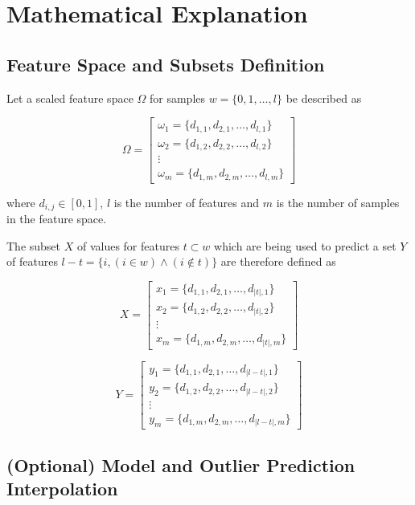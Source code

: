 \documentclass[a4paper, oneside, twocolumn]{article}
\begin{document}
\section{Mathematical Explanation}

\subsection{Feature Space and Subsets Definition}

Let a scaled feature space $\Omega$ for samples $w = \{0, 1, \ldots, l\}$ be described as

$$\Omega =
\begin{bmatrix}
{\omega_1 = \{d_{1, 1}, d_{2, 1}, \ldots, d_{l, 1}\}} \\
{\omega_2 = \{d_{1, 2}, d_{2, 2}, \ldots, d_{l, 2}\}} \\
\vdots \\
{\omega_m = \{d_{1, m}, d_{2, m}, \ldots, d_{l, m}\}}
\end{bmatrix}
$$

where $d_{i, j} \in [0,1]$, $l$ is the number of features and $m$ is the number of samples in the feature space.

The subset $X$ of values for features $t \subset w$ which are being used to predict a set $Y$ of features $l - t = \{i, (i \in w) \land (i \notin t)\}$ are therefore defined as

$$X =
\begin{bmatrix}
{x_1 = \{d_{1, 1}, d_{2, 1}, \ldots, d_{|t|, 1}\}} \\
{x_2 = \{d_{1, 2}, d_{2, 2}, \ldots, d_{|t|, 2}\}} \\
\vdots \\
{x_m = \{d_{1, m}, d_{2, m}, \ldots, d_{|t|, m}\}}
\end{bmatrix}
$$

$$Y =
\begin{bmatrix}
{y_1 = \{d_{1, 1}, d_{2, 1}, \ldots, d_{|l-t|, 1}\}} \\
{y_2 = \{d_{1, 2}, d_{2, 2}, \ldots, d_{|l-t|, 2}\}} \\
\vdots \\
{y_m = \{d_{1, m}, d_{2, m}, \ldots, d_{|l-t|, m}\}}
\end{bmatrix}
$$

\subsection{(Optional) Model and Outlier Prediction Interpolation }\label{interpolation}
\end{document}
